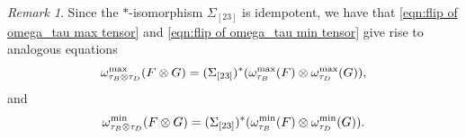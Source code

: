 \documentclass[11pt, a4paper, oneside, final, reqno]{amsart}
\theoremstyle{definition}
\theoremstyle{plain}
\theoremstyle{remark}
\newtheorem{remark}[definition]{Remark}
\numberwithin{equation}{section}
\begin{document}
\begin{remark}
    Since the $*$-isomorphism $\Sigma_{[23]}$ is idempotent, we have that \eqref{eqn:flip of omega_tau max tensor} and \eqref{eqn:flip of omega_tau min tensor} give rise to analogous equations
    \begin{equation}\label{eqn:flip of omega_tau max tensor alt}
        \omega_{\tau_B \otimes \tau_D}^{\rm max}(F \otimes G)
        = (\Sigma_{[23]})^*(\omega_{\tau_B}^{\rm max}(F) \otimes \omega_{\tau_D}^{\rm max}(G)),
    \end{equation}
    and
    \begin{equation}\label{eqn:flip of omega_tau min tensor alt}
        \omega_{\tau_B \otimes \tau_D}^{\rm min}(F \otimes G)
        = (\Sigma_{[23]})^*(\omega_{\tau_B}^{\rm min}(F) \otimes \omega_{\tau_D}^{\rm min}(G)).
    \end{equation}
\end{remark}
\end{document}
